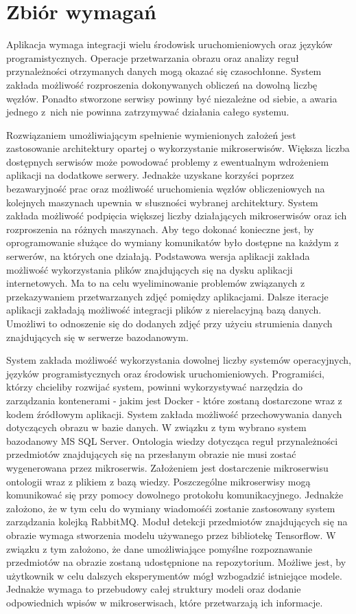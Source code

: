 \section{Zbiór wymagań}{
Aplikacja wymaga integracji wielu środowisk uruchomieniowych oraz języków programistycznych. Operacje przetwarzania obrazu oraz analizy reguł przynależności otrzymanych danych mogą okazać się czasochłonne. System zakłada możliwość rozproszenia dokonywanych obliczeń na dowolną liczbę węzłów. Ponadto stworzone serwisy powinny być niezależne od siebie, a awaria jednego z~nich nie powinna zatrzymywać działania całego systemu. 

Rozwiązaniem umożliwiającym spełnienie wymienionych założeń jest zastosowanie architektury opartej o wykorzystanie mikroserwisów. Większa liczba dostępnych serwisów może powodować problemy z ewentualnym wdrożeniem aplikacji na dodatkowe serwery. Jednakże uzyskane korzyści poprzez bezawaryjność prac oraz możliwość uruchomienia węzłów obliczeniowych na kolejnych maszynach upewnia w słuszności wybranej architektury. System zakłada możliwość podpięcia większej liczby działających mikroserwisów oraz ich rozproszenia na różnych maszynach. Aby tego dokonać konieczne jest, by oprogramowanie służące do wymiany komunikatów było dostępne na każdym z serwerów, na których one działają. Podstawowa wersja aplikacji zakłada możliwość wykorzystania plików znajdujących się na dysku aplikacji internetowych. Ma to na celu wyeliminowanie problemów związanych z przekazywaniem przetwarzanych zdjęć pomiędzy aplikacjami. Dalsze iteracje aplikacji zakładają możliwość integracji plików z nierelacyjną bazą danych. Umożliwi to odnoszenie się do dodanych zdjęć przy użyciu strumienia danych znajdujących się w serwerze bazodanowym.

System zakłada możliwość wykorzystania dowolnej liczby systemów operacyjnych, języków programistycznych oraz środowisk uruchomieniowych. Programiści, którzy chcieliby rozwijać system, powinni wykorzystywać narzędzia do zarządzania kontenerami - jakim jest Docker \cite{Docker}- które zostaną dostarczone wraz z kodem źródłowym aplikacji. System zakłada możliwość przechowywania danych dotyczących obrazu w bazie danych. W związku z tym wybrano system bazodanowy MS SQL Server. Ontologia wiedzy dotycząca reguł przynależności przedmiotów znajdujących się na przesłanym obrazie nie musi zostać wygenerowana przez mikroserwis. Założeniem jest dostarczenie mikroserwisu ontologii wraz z plikiem z bazą wiedzy. Poszczególne mikroserwisy mogą komunikować się przy pomocy dowolnego protokołu komunikacyjnego. Jednakże założono, że w tym celu do wymiany wiadomośći zostanie zastosowany system zarządzania kolejką RabbitMQ. Moduł detekcji przedmiotów znajdujących się na obrazie wymaga stworzenia modelu używanego przez bibliotekę Tensorflow. W związku z tym założono, że dane umożliwiające pomyślne rozpoznawanie przedmiotów na obrazie zostaną udostępnione na repozytorium. Możliwe jest, by użytkownik w celu dalszych eksperymentów mógł wzbogadzić istniejące modele. Jednakże wymaga to przebudowy całej struktury modeli oraz dodanie odpowiednich wpisów w mikroserwisach, które przetwarzają ich informacje.
}

